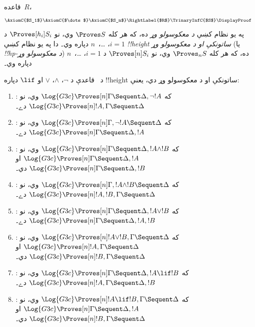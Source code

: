 \documentclass[../../../include/open-logic-section]{subfiles}
\begin{document}


\begin{defn}
قاعده~$R$،
\[
\AxiomC{$S_1$}
\AxiomC{$\dots$}
\AxiomC{$S_n$}
\RightLabel{$R$}
\TrinaryInfC{$S$}
\DisplayProof
\]
په يو نظام کښې \emph{د معکوسولو وړ} ده، که هر کله $\Proves S$
وي، نو $\Proves[h_i] S_i$ د $i = 1$، \dots،~$n$ دپاره وي۔
دا په يو نظام کښې \emph{!!{height} ساتونکې او د معکوسولو وړ}
(يا \emph{!!{hp}-د معکوسولو وړ}) ده، که هر کله $\Proves_n S$
وي، نو $\Proves[n] S_i$ د $i =
1$، \dots،~$n$ دپاره وي۔
\end{defn}

\begin{lem}
د~ قاعدې د $\lnot$، $\land$، $\lor$ او $\lif$ دپاره
!!{height} ساتونکې او د معکوسولو وړ دي، يعنې:
\begin{enumerate}
  \item \RightR{\lnot}: که $\Log{G3c} \Proves[n] \Gamma \Sequent
  \Delta, \lnot !A$ وي، نو $\Log{G3c} \Proves[n] !A, \Gamma \Sequent
  \Delta$ دے۔
  \item \LeftR{\lnot}: که $\Log{G3c} \Proves[n] \Gamma, \lnot !A
  \Sequent \Delta$ وي، نو $\Log{G3c} \Proves[n] \Gamma \Sequent \Delta,
  !A$ دے۔
  \item \RightR{\land}: که $\Log{G3c} \Proves[n] \Gamma \Sequent
  \Delta, !A \land !B$ وي، نو $\Log{G3c} \Proves[n] \Gamma \Sequent
  \Delta, !A$ او $\Log{G3c} \Proves[n] \Gamma \Sequent
  \Delta, !B$ دي۔
  \item \LeftR{\land}: که $\Log{G3c} \Proves[n] \Gamma, !A \land !B
  \Sequent \Delta$ وي، نو $\Log{G3c} \Proves[n] !A, !B, \Gamma \Sequent
  \Delta$ دے۔
  \item \RightR{\lor}: که $\Log{G3c} \Proves[n] \Gamma \Sequent
  \Delta, !A \lor !B$ وي، نو $\Log{G3c} \Proves[n] \Gamma \Sequent
  \Delta, !A, !B$ دے۔
  \item \LeftR{\lor}: که $\Log{G3c} \Proves[n] !A \lor !B, \Gamma \Sequent
  \Delta$ وي، نو $\Log{G3c} \Proves[n] !A, \Gamma \Sequent
  \Delta$ او $\Log{G3c} \Proves[n] !B, \Gamma \Sequent
  \Delta$ دي۔
  \item \RightR{\lif}: که $\Log{G3c} \Proves[n] \Gamma \Sequent
  \Delta, !A \lif !B$ وي، نو $\Log{G3c} \Proves[n] !A, \Gamma \Sequent
  \Delta, !B$ دے۔
  \item \LeftR{\lif}: که $\Log{G3c} \Proves[n] !A \lif !B, \Gamma
  \Sequent \Delta$ وي، نو $\Log{G3c} \Proves[n] \Gamma \Sequent \Delta,
  !A$ او $\Log{G3c} \Proves[n] !B, \Gamma \Sequent \Delta$ دي۔
\end{enumerate}
\end{lem}
\end{document}
